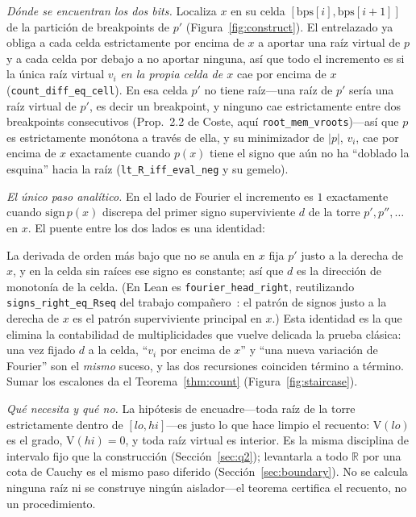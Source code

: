 \documentclass[11pt]{article}
\newcommand{\lean}[1]{\texttt{#1}}
\newcommand{\R}{\mathbb{R}}
\newcommand{\V}{\mathrm{V}}
\newcommand{\keyeq}[1]{\begin{center}\keybox{$\displaystyle #1$}\end{center}}
\begin{document}
\emph{D\'onde se encuentran los dos bits.} Localiza $x$ en su celda $[\mathrm{bps}[i],\mathrm{bps}[i+1]]$
de la partici\'on de breakpoints de $p'$ (Figura~\ref{fig:construct}). El entrelazado ya obliga a cada
celda estrictamente por encima de $x$ a aportar una ra\'iz virtual de $p$ y a cada celda por debajo a no
aportar ninguna, as\'i que todo el incremento es si la \'unica ra\'iz virtual $v_i$ \emph{en la propia
celda de $x$} cae por encima de $x$ (\lean{count\_diff\_eq\_cell}). En esa celda $p'$ no tiene ra\'iz---una
ra\'iz de $p'$ ser\'ia una ra\'iz virtual de $p'$, es decir un breakpoint, y ninguno cae estrictamente
entre dos breakpoints consecutivos (Prop.~2.2 de Coste, aqu\'i \lean{root\_mem\_vroots})---as\'i que $p$
es estrictamente mon\'otona a trav\'es de ella, y su minimizador de $|p|$, $v_i$, cae por encima de $x$
exactamente cuando $p(x)$ tiene el signo que a\'un no ha ``doblado la esquina'' hacia la ra\'iz
(\lean{lt\_R\_iff\_eval\_neg} y su gemelo).

\emph{El \'unico paso anal\'itico.} En el lado de Fourier el incremento es $1$ exactamente cuando
$\mathrm{sign}\,p(x)$ discrepa del primer signo superviviente $d$ de la torre $p',p'',\dots$ en $x$. El
puente entre los dos lados es una identidad:
\keyeq{d \;=\; \text{el signo de } p' \text{ en la celda de } x.}
La derivada de orden m\'as bajo que no se anula en $x$ fija $p'$ justo a la derecha de $x$, y en la
celda sin ra\'ices ese signo es constante; as\'i que $d$ es la direcci\'on de monoton\'ia de la celda.
(En Lean es \lean{fourier\_head\_right}, reutilizando \lean{signs\_right\_eq\_Rseq} del trabajo
compa\~nero~\cite{bflean}: el patr\'on de signos justo a la derecha de $x$ es el patr\'on superviviente
principal en $x$.) Esta identidad es la que elimina la contabilidad de multiplicidades que vuelve
delicada la prueba cl\'asica: una vez fijado $d$ a la celda, ``$v_i$ por encima de $x$'' y ``una nueva
variaci\'on de Fourier'' son el \emph{mismo} suceso, y las dos recursiones coinciden t\'ermino a
t\'ermino. Sumar los escalones da el Teorema~\ref{thm:count} (Figura~\ref{fig:staircase}).

\emph{Qu\'e necesita y qu\'e no.} La hip\'otesis de encuadre---toda ra\'iz de la torre estrictamente
dentro de $[lo,hi]$---es justo lo que hace limpio el recuento: $\V(lo)$ es el grado, $\V(hi)=0$, y toda
ra\'iz virtual es interior. Es la misma disciplina de intervalo fijo que la construcci\'on
(Secci\'on~\ref{sec:q2}); levantarla a todo $\R$ por una cota de Cauchy es el mismo paso diferido
(Secci\'on~\ref{sec:boundary}). No se calcula ninguna ra\'iz ni se construye ning\'un aislador---el
teorema certifica el recuento, no un procedimiento.
\end{document}

